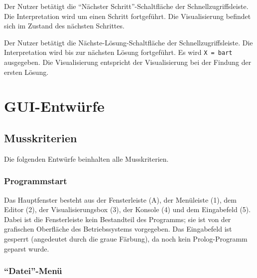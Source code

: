 \documentclass[parskip=full,11pt,twoside]{scrartcl}
\begin{document}
{Der Nutzer betätigt die \enquote{Nächster Schritt}-Schaltfläche der Schnellzugriffsleiste.}
{Die Interpretation wird um einen Schritt fortgeführt. Die Visualisierung befindet sich im Zustand des nächsten Schrittes.}

{Der Nutzer betätigt die Nächste-Lösung-Schaltfläche der Schnellzugriffsleiste.}
{Die Interpretation wird bis zur nächsten Lösung fortgeführt. Es wird \texttt{X = bart} ausgegeben. Die Visualisierung entspricht der Visualisierung bei der Findung der ersten Lösung.}

\appendix

\section{GUI-Entwürfe}

\subsection{Musskriterien}

Die folgenden Entwürfe beinhalten alle Musskriterien.

\subsubsection{Programmstart}

\begin{minipage}{\linewidth}
\end{minipage}

Das Hauptfenster besteht aus der Fensterleiste (A), der Menüleiste (1), dem Editor (2), der Visualisierungsbox (3), der Konsole (4) und dem Eingabefeld (5).
Dabei ist die Fensterleiste kein Bestandteil des Programms; sie ist von der grafischen Oberfläche des Betriebssystems vorgegeben.
Das Eingabefeld ist gesperrt (angedeutet durch die graue Färbung), da noch kein Prolog-Programm geparst wurde.

\subsubsection{\enquote{Datei}-Menü}
\end{document}
